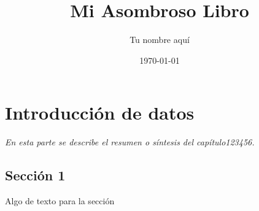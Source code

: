 \documentclass[]{book}
\title{\bf Mi Asombroso Libro}
\author{Tu nombre aquí}
\date{\today}
\begin{document}
\frontmatter
\maketitle
\tableofcontents
\mainmatter
\chapter{Introducción de datos }
\begin{center}
\textit{En esta parte se describe el resumen o síntesis
del capítulo123456.}
\end{center}
\section{Sección 1}
Algo de texto para la sección
\end{document}
